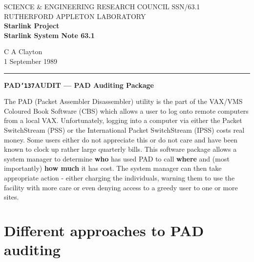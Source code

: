 \pagestyle{myheadings}
\setlength{\textwidth}{160mm}
\setlength{\textheight}{240mm}
\setlength{\topmargin}{-5mm}
\setlength{\oddsidemargin}{0mm}
\setlength{\evensidemargin}{0mm}
\setlength{\parindent}{0mm}
\setlength{\parskip}{\medskipamount}
\setlength{\unitlength}{1mm}

\renewcommand{\_}{{\tt\char'137}}     %

\thispagestyle{empty}
SCIENCE \& ENGINEERING RESEARCH COUNCIL \hfill SSN/63.1\\
RUTHERFORD APPLETON LABORATORY\\
{\large\bf Starlink Project\\}
{\large\bf Starlink System Note 63.1}
\begin{flushright}
C A Clayton\\
1 September 1989
\end{flushright}
\vspace{-4mm}
\rule{\textwidth}{0.5mm}
\vspace{5mm}
\begin{center}
{\Large\bf PAD\_AUDIT --- PAD Auditing Package}
\end{center}
\vspace{5mm}

The PAD (Packet Assembler Disassembler) utility is the part of the VAX/VMS
Coloured Book Software (CBS) which allows a user to log onto remote
computers from a local VAX. Unfortunately, logging into a computer via
either the  Packet SwitchStream (PSS) or the International Packet
SwitchStream (IPSS) costs real money. Some users either do not appreciate
this or do not care and have been known to clock up rather large quarterly
bills. This software package allows a system manager to determine {\bf who} has
used PAD to call {\bf where} and (most importantly) {\bf how much} it has cost.
The system manager can then take appropriate action - either charging the
individuals, warning them to use the facility with more care or even denying
access to a greedy user to one or more sites.

\section {Different approaches to PAD auditing}

